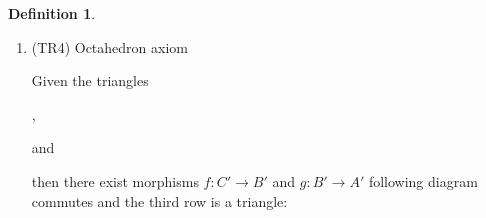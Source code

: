 \documentclass[12pt]{article}
\theoremstyle{definition}
\newtheorem{definition}{Definition}[section]
\theoremstyle{remark}
\begin{document}
\begin{definition}
\begin{enumerate}
                    Given the two triangles
                    and 
                    , and morphism $\phi_A : A \rightarrow A'$ and $\phi_B : B \rightarrow B'$ such that the square (1) commutes, then there is a morphism $\phi_C : C \rightarrow C'$ (not necessarily unique) such that $(\phi_A ,\phi_B ,\phi_C)$ is a morphism of triangles (2).
                    
                    \begin{center}
                        (1)
                        (2)
                    \end{center}
                \item (TR4) Octahedron axiom
                
                    Given the triangles 
                    ,
                     and

                     then there exist morphisms $f : C' \rightarrow B'$ and $g : B' \rightarrow A'$ following diagram commutes and the third row is a triangle:


\end{enumerate}
\end{definition}
\end{document}
